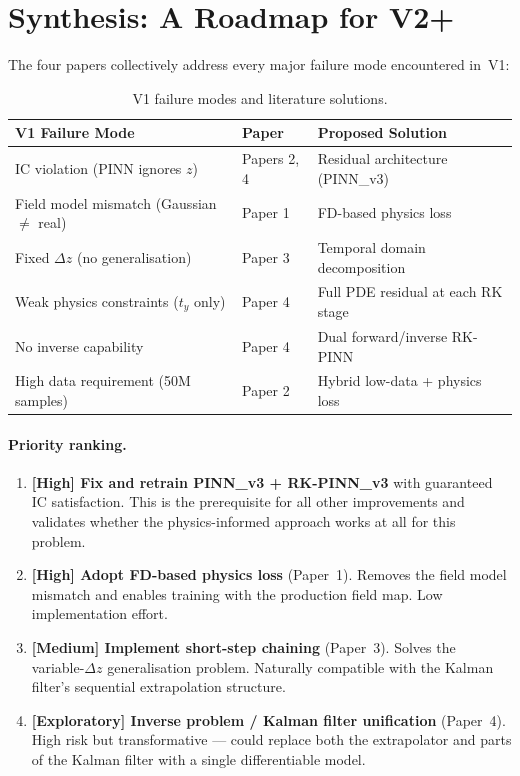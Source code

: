 \documentclass[12pt,a4paper]{article}
\begin{document}
\section{Synthesis: A Roadmap for V2+}
\label{sec:synthesis}

The four papers collectively address every major failure mode encountered in~V1:

\begin{table}[h]
\centering
\caption{V1 failure modes and literature solutions.}
\label{tab:roadmap}
\begin{tabular}{p{5cm}p{4cm}p{5cm}}
\toprule
\textbf{V1 Failure Mode} & \textbf{Paper} & \textbf{Proposed Solution} \\
\midrule
IC violation (PINN ignores $z$) & Papers 2, 4 & Residual architecture (PINN\_v3) \\
Field model mismatch (Gaussian $\neq$ real) & Paper 1 & FD-based physics loss \\
Fixed $\Delta z$ (no generalisation) & Paper 3 & Temporal domain decomposition \\
Weak physics constraints ($t_y$ only) & Paper 4 & Full PDE residual at each RK stage \\
No inverse capability & Paper 4 & Dual forward/inverse RK-PINN \\
High data requirement (50M samples) & Paper 2 & Hybrid low-data + physics loss \\
\bottomrule
\end{tabular}
\end{table}

\paragraph{Priority ranking.}
\begin{enumerate}
\item \textbf{[High] Fix and retrain PINN\_v3 + RK-PINN\_v3} with guaranteed IC satisfaction. This is the prerequisite for all other improvements and validates whether the physics-informed approach works at all for this problem.
\item \textbf{[High] Adopt FD-based physics loss} (Paper~1). Removes the field model mismatch and enables training with the production field map. Low implementation effort.
\item \textbf{[Medium] Implement short-step chaining} (Paper~3). Solves the variable-$\Delta z$ generalisation problem. Naturally compatible with the Kalman filter's sequential extrapolation structure.
\item \textbf{[Exploratory] Inverse problem / Kalman filter unification} (Paper~4). High risk but transformative --- could replace both the extrapolator and parts of the Kalman filter with a single differentiable model.
\end{enumerate}
\end{document}
